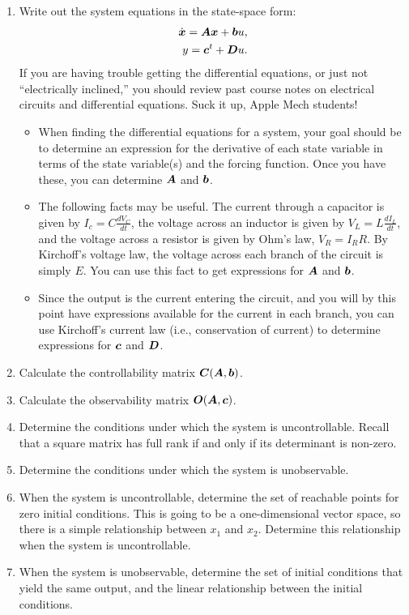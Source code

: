 \begin{enumerate}
\item Write out the system equations in the state-space form:
\begin{eqnarray*}
\dot{\boldsymbol{x}}=\boldsymbol{A}\boldsymbol{x}+\boldsymbol{b}u,\\y=\boldsymbol{c}^{t}+\boldsymbol{D}u.
\end{eqnarray*}
If you are having trouble getting the differential equations, or just not
``electrically inclined,'' you should review past course notes on electrical
circuits and differential equations.  Suck it up, Apple Mech students!
\begin{itemize}
\item When finding the differential equations for a system, your goal should
be to determine an expression for the derivative of each state variable in
terms of the state variable(s) and the forcing function.  Once you have
these, you can determine $\boldsymbol{A}$ and $\boldsymbol{b}$\@.

\item The following facts may be useful.  The current through a capacitor is
given by $I_{c}=C\frac{dV_{C}}{dt}$\@, the voltage across an inductor is
given by $V_{L}=L\frac{dI_{L}}{dt}$\@, and the voltage across a resistor is
given by Ohm's law, $V_{R}=I_{R}R$\@.  By Kirchoff's voltage law, the voltage
across each branch of the circuit is simply $E$\@. You can use this fact to
get expressions for $\boldsymbol{A}$ and $\boldsymbol{b}$\@.

\item Since the output is the current entering the circuit, and you will by
this point have expressions available for the current in each branch, you can
use Kirchoff's current law (i.e., conservation of current) to determine
expressions for $\boldsymbol{c}$ and $\boldsymbol{D}$\@.
\end{itemize}

\item Calculate the controllability matrix $\boldsymbol{C}(\boldsymbol{A},\boldsymbol{b})$\@.

\item Calculate the observability matrix $\boldsymbol{O}(\boldsymbol{A},\boldsymbol{c})$\@.

\item Determine the conditions under which the system is uncontrollable.
Recall that a square matrix has full rank if and only if its determinant is
non-zero.

\item Determine the conditions under which the system is unobservable.

\item When the system is uncontrollable, determine the set of reachable
points for zero initial conditions.  This is going to be a one-dimensional
vector space, so there is a simple relationship between $x_{1}$ and $x_{2}$.
Determine this relationship when the system is uncontrollable.

\item When the system is unobservable, determine the set of initial
conditions that yield the same output, and the linear relationship between
the initial conditions.
\end{enumerate}

